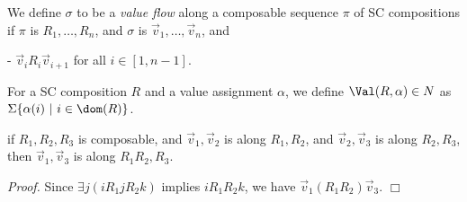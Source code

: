 \begin{Def}\rm
We define $\sigma$ to be a {\em value flow} along a composable sequence $\pi$ of
SC compositions 
if $\pi$ is $R_1,\ldots, R_n$,
and $\sigma$ is $\Vec v_1,\ldots,\Vec v_n$,
and 

- $\Vec v_i R_i \Vec v_{i+1}$ for all $i \in [1,n-1]$.

For a SC composition $R$ and a value assignment $\alpha$,
we define $\Val(R,\alpha) \in N$
as $\Sigma \{ \alpha(i) \ |\ i \in \dom(R) \}$.
\end{Def}

\begin{Lemma}\label{lemma:A}
if $R_1,R_2,R_3$ is composable,
and $\Vec v_1,\Vec v_2$ is along $R_1,R_2$, 
and $\Vec v_2,\Vec v_3$ is along $R_2,R_3$, 
then
$\Vec v_1,\Vec v_3$ is along $R_1R_2,R_3$.
\end{Lemma}

{\em Proof.}
Since $\exists j(i R_1 j R_2 k)$ implies $i R_1R_2 k$,
we have $\Vec v_1 (R_1R_2) \Vec v_3$.
$\Box$

